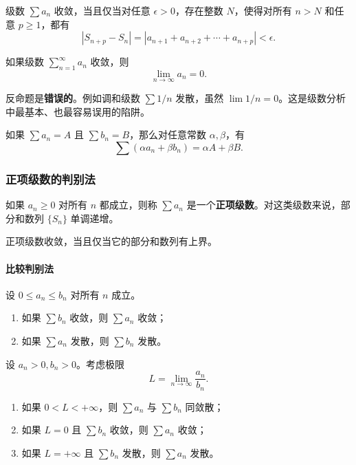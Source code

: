 \begin{theorem}
级数 $\sum a_n$ 收敛，当且仅当对任意 $\epsilon>0$，存在整数 $N$，使得对所有 $n>N$ 和任意 $p\geq 1$，都有
\[
    |S_{n+p}-S_n|=|a_{n+1}+a_{n+2}+\cdots+a_{n+p}|<\epsilon.
\]
\end{theorem}

\begin{theorem}[收敛的必要条件]
如果级数 $\sum_{n=1}^{\infty}a_n$ 收敛，则
\[
    \lim_{n\to\infty}a_n=0.
\]
\end{theorem}

反命题是\textbf{错误的}。例如调和级数 $\sum 1/n$ 发散，虽然 $\lim 1/n=0$。这是级数分析中最基本、也最容易误用的陷阱。

\begin{property}[线性性]
如果 $\sum a_n=A$ 且 $\sum b_n=B$，那么对任意常数 $\alpha,\beta$，有
\[
    \sum(\alpha a_n+\beta b_n)=\alpha A+\beta B.
\]
\end{property}

\subsubsection{正项级数的判别法}

如果 $a_n\geq0$ 对所有 $n$ 都成立，则称 $\sum a_n$ 是一个\textbf{正项级数}。对这类级数来说，部分和数列 $\{S_n\}$ 单调递增。

\begin{theorem}
正项级数收敛，当且仅当它的部分和数列有上界。
\end{theorem}

\paragraph{比较判别法}

\begin{theorem}[直接比较判别法]
设 $0\leq a_n\leq b_n$ 对所有 $n$ 成立。
\begin{enumerate}
    \item 如果 $\sum b_n$ 收敛，则 $\sum a_n$ 收敛；
    \item 如果 $\sum a_n$ 发散，则 $\sum b_n$ 发散。
\end{enumerate}
\end{theorem}

\begin{theorem}[极限比较判别法]
设 $a_n>0,b_n>0$。考虑极限
\[
    L=\lim_{n\to\infty}\frac{a_n}{b_n}.
\]
\begin{enumerate}
    \item 如果 $0<L<+\infty$，则 $\sum a_n$ 与 $\sum b_n$ 同敛散；
    \item 如果 $L=0$ 且 $\sum b_n$ 收敛，则 $\sum a_n$ 收敛；
    \item 如果 $L=+\infty$ 且 $\sum b_n$ 发散，则 $\sum a_n$ 发散。
\end{enumerate}
\end{theorem}


